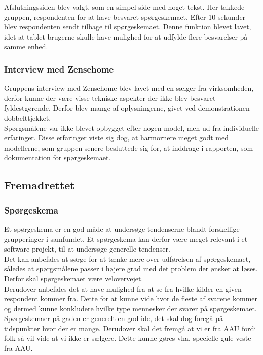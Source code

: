 Afslutningssiden blev valgt, som en simpel side med noget tekst. Her takkede gruppen, respondenten for at have besvaret spørgeskemaet. Efter 10 sekunder blev respondenten sendt tilbage til spørgeskemaet. Denne funktion blevet lavet, idet at tablet-brugerne skulle have mulighed for at udfylde flere besvarelser på samme enhed. \\

\subsubsection{Interview med Zensehome}
Gruppens interview med Zensehome blev lavet med en sælger fra virksomheden, derfor kunne der være visse tekniske aspekter der ikke blev besvaret fyldestgørende. Derfor blev mange af oplysningerne, givet ved demonstrationen dobbelttjekket. \\

Spørgsmålene var ikke blevet opbygget efter nogen model, men ud fra individuelle erfaringer. Disse erfaringer viste sig dog, at harmornere meget godt med modellerne, som gruppen senere besluttede sig for, at inddrage i rapporten, som dokumentation for spørgeskemaet. \\

\subsection{Fremadrettet}
\subsubsection{Spørgeskema}
Et spørgeskema er en god måde at undersøge tendenserne blandt forskellige grupperinger i samfundet. Et spørgeskema kan derfor være meget relevant i et software projekt, til at undersøge generelle tendenser.\\

Det kan anbefales at sørge for at tænke mere over udførelsen af spørgeskemaet, således at spørgsmålene passer i højere grad med det problem der ønsker at løses. Derfor skal spørgeskemaet være velovervejet.\\

Derudover anbefales det at have mulighed fra at se fra hvilke kilder en given respondent kommer fra. Dette for at kunne vide hvor de fleste af svarene kommer og dermed kunne konkludere hvilke type mennesker der svarer på spørgeskemaet.\\

Spørgeskemaer på gaden er generelt en god ide, det skal dog foregå på tidspunkter hvor der er mange. Derudover skal det fremgå at vi er fra AAU fordi folk så vil vide at vi ikke er sælgere. Dette kunne gøres vha. specielle gule veste fra AAU.\\

